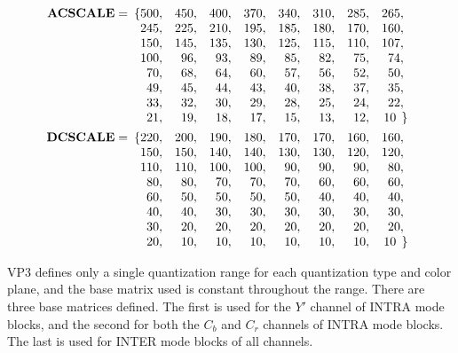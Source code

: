 \documentclass[9pt,letterpaper]{book}
\newcommand{\bitvar}[1]{\ensuremath{\mathbf{\bm{#1}}}}
\numberwithin{equation}{chapter}
\numberwithin{figure}{chapter}
\numberwithin{table}{chapter}
\begin{document}
\begin{align*}
\bitvar{ACSCALE} = & \begin{array}[t]{r@{}rrrrrrrr@{}l}
\{ & 500, & 450, & 400, & 370, & 340, & 310, & 285, & 265,   &      \\
   & 245, & 225, & 210, & 195, & 185, & 180, & 170, & 160,   &      \\
   & 150, & 145, & 135, & 130, & 125, & 115, & 110, & 107,   &      \\
   & 100, &  96, &  93, &  89, &  85, &  82, &  75, &  74,   &      \\
   &  70, &  68, &  64, &  60, &  57, &  56, &  52, &  50,   &      \\
   &  49, &  45, &  44, &  43, &  40, &  38, &  37, &  35,   &      \\
   &  33, &  32, &  30, &  29, &  28, &  25, &  24, &  22,   &      \\
   &  21, &  19, &  18, &  17, &  15, &  13, &  12, &  10\;\ & \!\} \\
\end{array} \\
\bitvar{DCSCALE} = & \begin{array}[t]{r@{}rrrrrrrr@{}l}
\{ & 220, & 200, & 190, & 180, & 170, & 170, & 160, & 160,   &      \\
   & 150, & 150, & 140, & 140, & 130, & 130, & 120, & 120,   &      \\
   & 110, & 110, & 100, & 100, &  90, &  90, &  90, &  80,   &      \\
   &  80, &  80, &  70, &  70, &  70, &  60, &  60, &  60,   &      \\
   &  60, &  50, &  50, &  50, &  50, &  40, &  40, &  40,   &      \\
   &  40, &  40, &  30, &  30, &  30, &  30, &  30, &  30,   &      \\
   &  30, &  20, &  20, &  20, &  20, &  20, &  20, &  20,   &      \\
   &  20, &  10, &  10, &  10, &  10, &  10, &  10, &  10\;\ & \!\} \\
\end{array}
\end{align*}

VP3 defines only a single quantization range for each quantization type and
 color plane, and the base matrix used is constant throughout the range.
There are three base matrices defined.
The first is used for the $Y'$ channel of INTRA mode blocks, and the second for
 both the $C_b$ and $C_r$ channels of INTRA mode blocks.
The last is used for INTER mode blocks of all channels.
\end{document}
